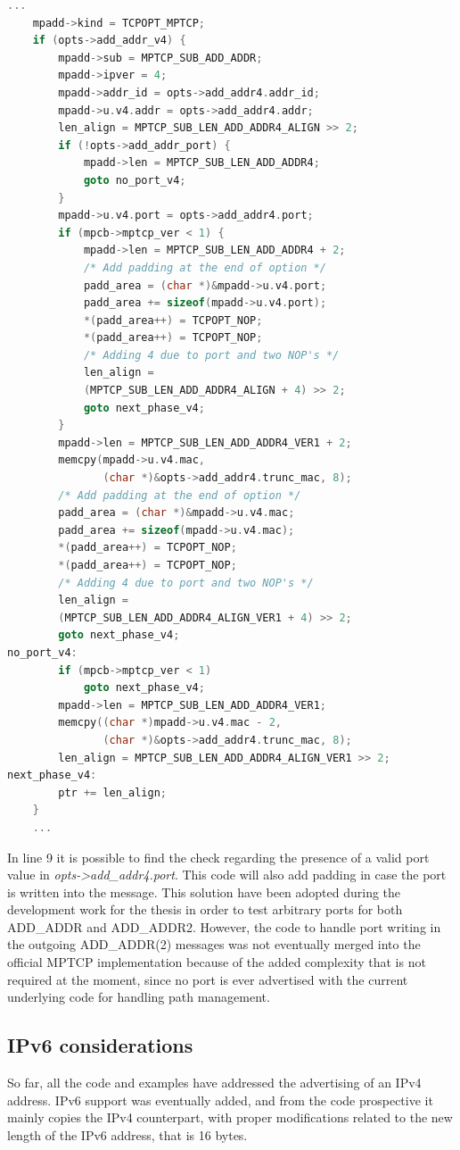 \begin{lstlisting}[language=c, caption=Code to build the outgoing ADD\_ADDR(2) packet with added support for the port value, label=outport]
	...
	mpadd->kind = TCPOPT_MPTCP;
	if (opts->add_addr_v4) {
		mpadd->sub = MPTCP_SUB_ADD_ADDR;
		mpadd->ipver = 4;
		mpadd->addr_id = opts->add_addr4.addr_id;
		mpadd->u.v4.addr = opts->add_addr4.addr;
		len_align = MPTCP_SUB_LEN_ADD_ADDR4_ALIGN >> 2;
		if (!opts->add_addr_port) {
			mpadd->len = MPTCP_SUB_LEN_ADD_ADDR4;
			goto no_port_v4;
		}
		mpadd->u.v4.port = opts->add_addr4.port;
		if (mpcb->mptcp_ver < 1) {
			mpadd->len = MPTCP_SUB_LEN_ADD_ADDR4 + 2;
			/* Add padding at the end of option */
			padd_area = (char *)&mpadd->u.v4.port;
			padd_area += sizeof(mpadd->u.v4.port);
			*(padd_area++) = TCPOPT_NOP;
			*(padd_area++) = TCPOPT_NOP;
			/* Adding 4 due to port and two NOP's */
			len_align =
			(MPTCP_SUB_LEN_ADD_ADDR4_ALIGN + 4) >> 2;
			goto next_phase_v4;
		}
		mpadd->len = MPTCP_SUB_LEN_ADD_ADDR4_VER1 + 2;
		memcpy(mpadd->u.v4.mac,
		       (char *)&opts->add_addr4.trunc_mac, 8);
		/* Add padding at the end of option */
		padd_area = (char *)&mpadd->u.v4.mac;
		padd_area += sizeof(mpadd->u.v4.mac);
		*(padd_area++) = TCPOPT_NOP;
		*(padd_area++) = TCPOPT_NOP;
		/* Adding 4 due to port and two NOP's */
		len_align =
		(MPTCP_SUB_LEN_ADD_ADDR4_ALIGN_VER1 + 4) >> 2;
		goto next_phase_v4;
no_port_v4:
		if (mpcb->mptcp_ver < 1)
			goto next_phase_v4;
		mpadd->len = MPTCP_SUB_LEN_ADD_ADDR4_VER1;
		memcpy((char *)mpadd->u.v4.mac - 2,
		       (char *)&opts->add_addr4.trunc_mac, 8);
		len_align = MPTCP_SUB_LEN_ADD_ADDR4_ALIGN_VER1 >> 2;
next_phase_v4:
		ptr += len_align;
	}
	...
\end{lstlisting}

In line 9 it is possible to find the check regarding the presence of a valid port value in \textit{opts->add\_addr4.port}. This code will also add padding in case the port is written into the message. This solution have been adopted during the development work for the thesis in order to test arbitrary ports for both ADD\_ADDR and ADD\_ADDR2. However, the code to handle port writing in the outgoing ADD\_ADDR(2) messages was not eventually merged into the official MPTCP implementation because of the added complexity that is not required at the moment, since no port is ever advertised with the current underlying code for handling path management.

\subsection{IPv6 considerations}
So far, all the code and examples have addressed the advertising of an IPv4 address. IPv6 support was eventually added, and from the code prospective it mainly copies the IPv4 counterpart, with proper modifications related to the new length of the IPv6 address, that is 16 bytes.

